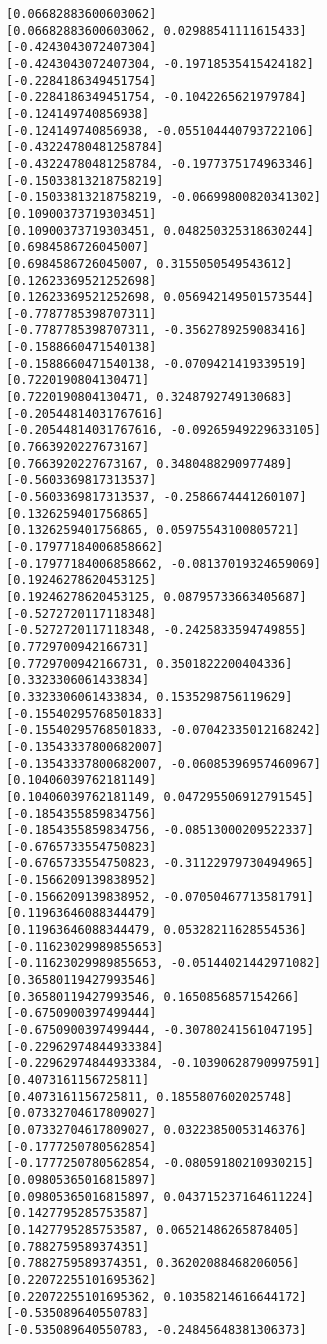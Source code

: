 \documentclass[11pt]{article}
\begin{document}
\begin{Verbatim}[commandchars=\\\{\}]
[0.06682883600603062]
[0.06682883600603062, 0.02988541111615433]
[-0.4243043072407304]
[-0.4243043072407304, -0.19718535415424182]
[-0.2284186349451754]
[-0.2284186349451754, -0.1042265621979784]
[-0.124149740856938]
[-0.124149740856938, -0.055104440793722106]
[-0.43224780481258784]
[-0.43224780481258784, -0.1977375174963346]
[-0.15033813218758219]
[-0.15033813218758219, -0.06699800820341302]
[0.10900373719303451]
[0.10900373719303451, 0.048250325318630244]
[0.6984586726045007]
[0.6984586726045007, 0.3155050549543612]
[0.12623369521252698]
[0.12623369521252698, 0.056942149501573544]
[-0.7787785398707311]
[-0.7787785398707311, -0.3562789259083416]
[-0.1588660471540138]
[-0.1588660471540138, -0.0709421419339519]
[0.7220190804130471]
[0.7220190804130471, 0.3248792749130683]
[-0.20544814031767616]
[-0.20544814031767616, -0.09265949229633105]
[0.7663920227673167]
[0.7663920227673167, 0.3480488290977489]
[-0.5603369817313537]
[-0.5603369817313537, -0.2586674441260107]
[0.1326259401756865]
[0.1326259401756865, 0.05975543100805721]
[-0.17977184006858662]
[-0.17977184006858662, -0.08137019324659069]
[0.19246278620453125]
[0.19246278620453125, 0.08795733663405687]
[-0.5272720117118348]
[-0.5272720117118348, -0.2425833594749855]
[0.7729700942166731]
[0.7729700942166731, 0.3501822200404336]
[0.3323306061433834]
[0.3323306061433834, 0.1535298756119629]
[-0.15540295768501833]
[-0.15540295768501833, -0.07042335012168242]
[-0.13543337800682007]
[-0.13543337800682007, -0.06085396957460967]
[0.10406039762181149]
[0.10406039762181149, 0.047295506912791545]
[-0.1854355859834756]
[-0.1854355859834756, -0.08513000209522337]
[-0.6765733554750823]
[-0.6765733554750823, -0.31122979730494965]
[-0.1566209139838952]
[-0.1566209139838952, -0.07050467713581791]
[0.11963646088344479]
[0.11963646088344479, 0.05328211628554536]
[-0.11623029989855653]
[-0.11623029989855653, -0.05144021442971082]
[0.36580119427993546]
[0.36580119427993546, 0.1650856857154266]
[-0.6750900397499444]
[-0.6750900397499444, -0.30780241561047195]
[-0.22962974844933384]
[-0.22962974844933384, -0.10390628790997591]
[0.4073161156725811]
[0.4073161156725811, 0.1855807602025748]
[0.07332704617809027]
[0.07332704617809027, 0.03223850053146376]
[-0.1777250780562854]
[-0.1777250780562854, -0.08059180210930215]
[0.09805365016815897]
[0.09805365016815897, 0.043715237164611224]
[0.1427795285753587]
[0.1427795285753587, 0.06521486265878405]
[0.7882759589374351]
[0.7882759589374351, 0.36202088468206056]
[0.22072255101695362]
[0.22072255101695362, 0.10358214616644172]
[-0.535089640550783]
[-0.535089640550783, -0.24845648381306373]

\end{Verbatim}
\end{document}
